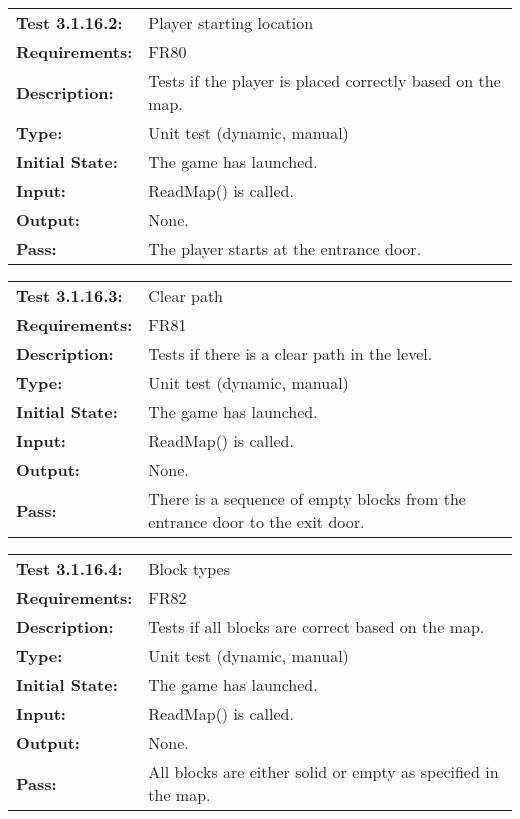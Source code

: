 \documentclass[12pt, titlepage]{article}
\begin{document}
\begin{tabular}{|l|p{10cm}|}
    \hline
    \bf{Test} 3.1.16.2: & Player starting location \\
    \bf{Requirements}: & FR80 \\
    \bf{Description}: & Tests if the player is placed correctly based on the map. \\
    \bf{Type}: & Unit test (dynamic, manual) \\
    \bf{Initial State}: & The game has launched. \\
    \bf{Input}: & ReadMap() is called. \\
    \bf{Output}: & None. \\
    \bf{Pass}: & The player starts at the entrance door. \\
    \hline
\end{tabular}

\begin{tabular}{|l|p{10cm}|}
    \hline
    \bf{Test} 3.1.16.3: & Clear path \\
    \bf{Requirements}: & FR81 \\
    \bf{Description}: & Tests if there is a clear path in the level. \\
    \bf{Type}: & Unit test (dynamic, manual) \\
    \bf{Initial State}: & The game has launched. \\
    \bf{Input}: & ReadMap() is called. \\
    \bf{Output}: & None. \\
    \bf{Pass}: & There is a sequence of empty blocks from the entrance door to the exit door. \\
    \hline
\end{tabular}

\begin{tabular}{|l|p{10cm}|}
    \hline
    \bf{Test} 3.1.16.4: & Block types \\
    \bf{Requirements}: & FR82 \\
    \bf{Description}: & Tests if all blocks are correct based on the map. \\
    \bf{Type}: & Unit test (dynamic, manual) \\
    \bf{Initial State}: & The game has launched. \\
    \bf{Input}: & ReadMap() is called. \\
    \bf{Output}: & None. \\
    \bf{Pass}: & All blocks are either solid or empty as specified in the map. \\
    \hline
\end{tabular}
\end{document}
